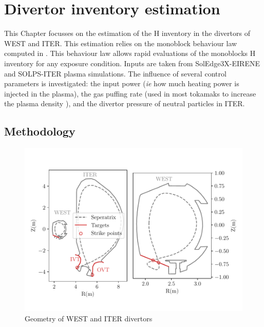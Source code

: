 \setchapterpreamble[u]{\margintoc}
\chapter{Divertor inventory estimation}\label{Chapter4}


This Chapter focusses on the estimation of the H inventory in the divertors of WEST and ITER.
This estimation relies on the monoblock behaviour law computed in .
This behaviour law allows rapid evaluations of the monoblocks H inventory for any exposure condition.
Inputs are taken from SolEdge3X-EIRENE \cite{bufferand_three-dimensional_2019} and SOLPS-ITER \cite{kaveeva_solps-iter_2020} plasma simulations.
The influence of several control parameters is investigated: the input power (\textit{ie} how much heating power is injected in the plasma), the gas puffing rate (used in most tokamaks to increase the plasma density \cite{zweben_effect_2014}), and the divertor pressure of neutral particles in ITER.


\section{Methodology}
\begin{figure}[h!]
    \centering
    \includegraphics[width=0.95\linewidth]{Figures/Chapter4/coordinates.pdf}
    \caption{Geometry of WEST and ITER divertors}
\end{figure}

